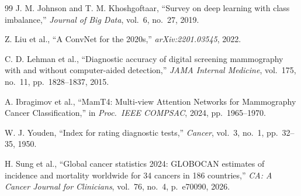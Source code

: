 \documentclass[conference]{IEEEtran}
\begin{document}
\begin{thebibliography}{99}
 J. M. Johnson and T. M. Khoshgoftaar, ``Survey on deep learning with class imbalance,'' \emph{Journal of Big Data}, vol.~6, no.~27, 2019.

 Z. Liu et al., ``A ConvNet for the 2020s,'' \emph{arXiv:2201.03545}, 2022.

 C. D. Lehman et al., ``Diagnostic accuracy of digital screening mammography with and without computer-aided detection,'' \emph{JAMA Internal Medicine}, vol.~175, no.~11, pp.~1828--1837, 2015.

 A. Ibragimov et al., ``MamT4: Multi-view Attention Networks for Mammography Cancer Classification,'' in \emph{Proc.\ IEEE COMPSAC}, 2024, pp.~1965--1970.

 W. J. Youden, ``Index for rating diagnostic tests,'' \emph{Cancer}, vol.~3, no.~1, pp.~32--35, 1950.

 H. Sung et al., ``Global cancer statistics 2024: GLOBOCAN estimates of incidence and mortality worldwide for 34 cancers in 186 countries,'' \emph{CA: A Cancer Journal for Clinicians}, vol.~76, no.~4, p.~e70090, 2026.

\end{thebibliography}
\end{document}

